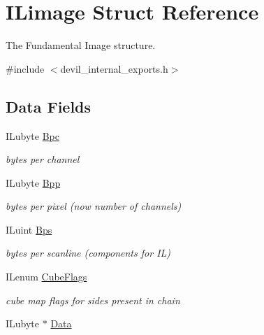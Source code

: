 \hypertarget{struct_i_limage}{\section{I\+Limage Struct Reference}
\label{struct_i_limage}
}


The Fundamental Image structure.  




{\ttfamily \#include $<$devil\+\_\+internal\+\_\+exports.\+h$>$}

\subsection*{Data Fields}
\begin{DoxyCompactItemize}
\item 
\hypertarget{struct_i_limage_a77cd917981bd92ddb76c5108db5993e8}{I\+Lubyte \hyperlink{struct_i_limage_a77cd917981bd92ddb76c5108db5993e8}{Bpc}}\label{struct_i_limage_a77cd917981bd92ddb76c5108db5993e8}

\begin{DoxyCompactList}\small\item\em bytes per channel \end{DoxyCompactList}\item 
\hypertarget{struct_i_limage_acb619433784a0e26c0f1f18b3700c9f7}{I\+Lubyte \hyperlink{struct_i_limage_acb619433784a0e26c0f1f18b3700c9f7}{Bpp}}\label{struct_i_limage_acb619433784a0e26c0f1f18b3700c9f7}

\begin{DoxyCompactList}\small\item\em bytes per pixel (now number of channels) \end{DoxyCompactList}\item 
\hypertarget{struct_i_limage_a014c9fe6e8ca1f1343288fd3be38249f}{I\+Luint \hyperlink{struct_i_limage_a014c9fe6e8ca1f1343288fd3be38249f}{Bps}}\label{struct_i_limage_a014c9fe6e8ca1f1343288fd3be38249f}

\begin{DoxyCompactList}\small\item\em bytes per scanline (components for I\+L) \end{DoxyCompactList}\item 
\hypertarget{struct_i_limage_a2141dcf3ce36303a8c31d417d9337034}{I\+Lenum \hyperlink{struct_i_limage_a2141dcf3ce36303a8c31d417d9337034}{Cube\+Flags}}\label{struct_i_limage_a2141dcf3ce36303a8c31d417d9337034}

\begin{DoxyCompactList}\small\item\em cube map flags for sides present in chain \end{DoxyCompactList}\item 
\hypertarget{struct_i_limage_a32fd28ac5d89e3ef2f9151330af0149d}{I\+Lubyte $\ast$ \hyperlink{struct_i_limage_a32fd28ac5d89e3ef2f9151330af0149d}{Data}}\label{struct_i_limage_a32fd28ac5d89e3ef2f9151330af0149d}


\end{DoxyCompactItemize}

